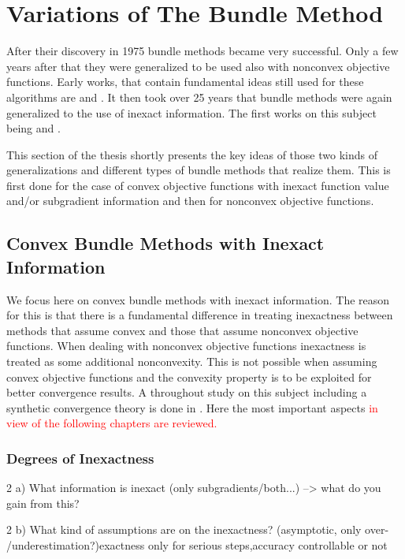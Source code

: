 \section{Variations of The Bundle Method}

After their discovery in 1975 bundle methods became very successful. Only a few years after that they were generalized to be used also with nonconvex objective functions. Early works, that contain fundamental ideas still used for these algorithms are \cite{Mifflin1982} and \cite{Kiwiel1985}. It then took over 25 years that bundle methods were again generalized to the use of inexact information. The first works on this subject being \cite{Hintermueller2001,Kiwiel2006} and \cite{Solodov2003}.

This section of the thesis shortly presents the key ideas of those two kinds of generalizations and different types of bundle methods that realize them.
This is first done for the case of convex objective functions with inexact function value and/or subgradient information and then for nonconvex objective functions. 


\subsection{Convex Bundle Methods with Inexact Information}

We focus here on convex bundle methods with inexact information. The reason for this is that there is a fundamental difference in treating inexactness between methods that assume convex and those that assume nonconvex objective functions.
When dealing with nonconvex objective functions inexactness is treated as some additional nonconvexity. This is not possible when assuming convex objective functions and the convexity property is to be exploited for better convergence results.
A throughout study on this subject including a synthetic convergence theory is done in \cite{Oliveira2014}. Here the most important aspects \textcolor{red}{in view of the following chapters are reviewed.}

\subsubsection{Degrees of Inexactness}

2 a) What information is inexact (only subgradients/both...) --> what do you gain from this?


2 b) What kind of assumptions are on the inexactness? (asymptotic, only over- /underestimation?)exactness only for serious steps,accuracy controllable or not

